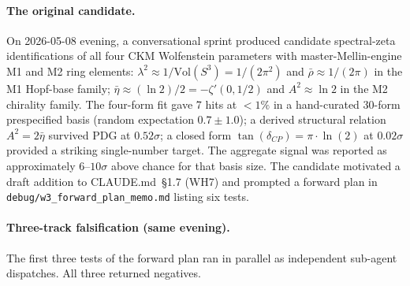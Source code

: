 \documentclass[11pt]{article}
\begin{document}
\paragraph{The original candidate.}
On 2026-05-08 evening, a conversational sprint produced candidate
spectral-zeta identifications of all four CKM Wolfenstein parameters
with master-Mellin-engine M1 and M2 ring elements:
$\lambda^2 \approx 1/\mathrm{Vol}(S^3) = 1/(2\pi^2)$ and
$\bar\rho \approx 1/(2\pi)$ in the M1 Hopf-base family;
$\bar\eta \approx (\ln 2)/2 = -\zeta'(0,1/2)$ and
$A^2 \approx \ln 2$ in the M2 chirality family.  The four-form fit
gave 7 hits at $<1\%$ in a hand-curated 30-form prespecified basis
(random expectation $0.7\pm 1.0$); a derived structural relation
$A^2 = 2\bar\eta$ survived PDG at $0.52\sigma$; a closed form
$\tan(\delta_{CP}) = \pi\cdot\ln(2)$ at $0.02\sigma$ provided a
striking single-number target.  The aggregate signal was reported as
approximately $6$--$10\sigma$ above chance for that basis size.  The
candidate motivated a draft addition to CLAUDE.md~\S 1.7 (WH7) and
prompted a forward plan in
\texttt{debug/w3\_forward\_plan\_memo.md} listing six tests.

\paragraph{Three-track falsification (same evening).}
The first three tests of the forward plan ran in parallel as
independent sub-agent dispatches.  All three returned negatives.
\end{document}
